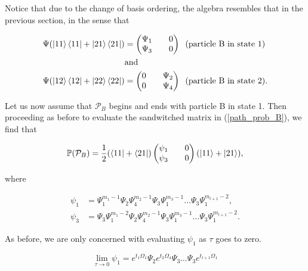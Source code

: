 \documentclass{article}
\begin{document}
Notice that due to the change of basis ordering, the algebra resembles that in the previous section, in the sense that

\begin{align}
  \Psi(\ket{11}\bra{11} + \ket{21}\bra{21}) &= \begin{pmatrix} \Psi_1 && 0 \\
  \Psi_3 && 0 \end{pmatrix} \; \; \text{(particle B in state 1)} \\
  &\text{and} \nonumber \\
  \Psi(\ket{12}\bra{12} + \ket{22}\bra{22}) &= \begin{pmatrix} 0 && \Psi_2 \\
  0 && \Psi_4 \end{pmatrix} \; \; \text{(particle B in state 2)}.
\end{align}

Let us now assume that $\mathcal{P}_B$ begins and ends with particle B in state 1. Then proceeding as before to evaluate the sandwitched matrix in (\ref{path_prob_B}), we find that

\begin{equation}\label{inner_prod_B}
  \mathbb{P}(\mathcal{P}_B) = \frac{1}{2}(\bra{11}+\bra{21})\begin{pmatrix} \psi_1 && 0 \\ \psi_3 && 0 \end{pmatrix} (\ket{11} + \ket{21}),
\end{equation}

where


\begin{align}
\psi_1 &= \Psi_1^{m_1-1}\Psi_2\Psi_4^{m_2-1}\Psi_3\Psi_1^{m_3-1}\ldots \Psi_3\Psi_1^{m_{l+1} -2}, \\
\psi_3 &= \Psi_3\Psi_1^{m_1-2}\Psi_2\Psi_4^{m_2-1}\Psi_3\Psi_1^{m_3-1}\ldots \Psi_3\Psi_1^{m_{l+1} -2} .
\end{align}

As before, we are only concerned with evaluating $\psi_1$ as $\tau$ goes to zero.

\begin{equation}\label{lim_psi1}
  \lim_{\tau \rightarrow 0} \psi_1 = e^{t_1\Omega_1}\Psi_2 e^{t_2\Omega_4}\Psi_3\ldots\Psi_3
  e^{t_{l+1}\Omega_1}
\end{equation}
\end{document}
